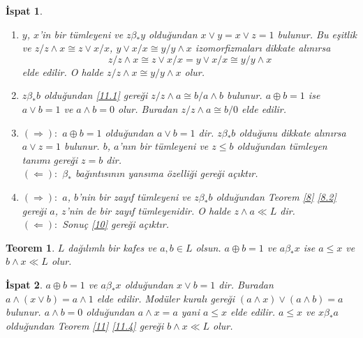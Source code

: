 \documentclass[a4paper,12pt]{article}
\numberwithin{equation}{section}
\theoremstyle{italik}
\newtheorem{teorem}{Teorem}[section]
\newtheorem*{ispat}{İspat}
\begin{document}
\begin{ispat}
  \begin{enumerate}
    \item
      $ y $, $ x $'in bir tümleyeni ve $ z \beta_* y $ olduğundan $ x \vee y = x \vee z = 1 $ bulunur. 
      Bu eşitlik ve $ z / z \wedge x \cong z \vee x / x $,  $ y \vee x / x \cong y / y \wedge x $ 
      izomorfizmaları dikkate alınırsa 
      $$ z / z \wedge x \cong z \vee x / x = y \vee x / x \cong y / y \wedge x $$ 
      elde edilir. O halde $ z / z \wedge x \cong y / y \wedge x $ olur.
    \item 
      $ z \beta_* b $ olduğundan \ref{11.1} gereği $ z / z \wedge a \cong b / a \wedge b $ bulunur. 
      $ a \oplus b = 1 $ ise $ a \vee b = 1 $ ve $ a \wedge b = 0 $ olur. Buradan 
      $ z / z \wedge a \cong b / 0 $ elde edilir.
    \item
      $ ( \Rightarrow ):$ $ a \oplus b = 1 $ olduğundan $ a \vee b = 1 $ dir. $ z \beta_* b $ 
      olduğunu dikkate alınırsa $ a \vee z = 1 $ bulunur. $ b $, $ a $'nın bir tümleyeni ve $ z \leq b $ 
      olduğundan tümleyen tanımı gereği $ z = b $ dir. \\ 
      $ ( \Leftarrow ):$ $ \beta_* $ bağıntısının yansıma özelliği gereği açıktır.
    \item
      $ ( \Rightarrow ):$ $ a $, $ b $'nin bir zayıf tümleyeni ve $ z \beta_* b $ olduğundan 
      Teorem \ref{8} \ref{8.2} gereği $ a $, $ z $'nin de bir zayıf tümleyenidir. O halde 
      $ z \wedge a \ll L $ dir. \\
      $ ( \Leftarrow ):$ Sonuç \ref{10} gereği açıktır.
  \end{enumerate}
\end{ispat}


\begin{teorem}\label{12}
  $ L $ dağılımlı bir kafes ve $ a,b \in L $ olsun. $ a \oplus b = 1 $ ve $ a \beta_* x $ ise $ a \leq x $ ve 
  $ b \wedge x \ll L $ olur.
\end{teorem}
\begin{ispat}
  $ a \oplus b = 1 $ ve $ a \beta_* x $ olduğundan $ x \vee b = 1 $ dir. Buradan $ a \wedge ( x \vee b ) = a\wedge 1 $ 
  elde edilir. Modüler kuralı gereği $ ( a \wedge x ) \vee ( a \wedge b ) = a $ bulunur. $ a \wedge b =  0 $ olduğundan 
  $ a \wedge x = a $ yani $ a \leq x $ elde edilir. $ a \leq x $ ve $ x \beta_* a $ olduğundan Teorem \ref{11} \ref{11.4} gereği $ b \wedge x \ll L $ olur.
\end{ispat}
\end{document}

